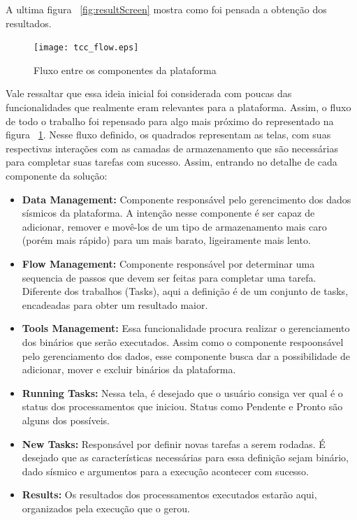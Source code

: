 \documentclass[11pt,twoside]{article}
\begin{document}
A ultima figura ~\ref{fig:resultScreen} mostra como foi pensada a obtenção dos resultados.

\begin{figure}[!h]
  \centering
  \texttt{[image: tcc\_flow.eps]}
  \caption{Fluxo entre os componentes da plataforma}
  \label{fig:flowScreen}
\end{figure}

Vale ressaltar que essa ideia inicial foi considerada com poucas das funcionalidades que realmente eram relevantes para a plataforma. Assim, o fluxo de todo o trabalho foi 
repensado para algo mais próximo do representado na figura ~\ref{fig:flowScreen}. Nesse fluxo definido, os quadrados representam as telas, com suas respectivas interações com 
as camadas de armazenamento que são necessárias para completar suas tarefas com sucesso. Assim, entrando no detalhe de cada componente da solução:

\begin{itemize}
  \item \textbf{Data Management:} Componente responsável pelo gerencimento dos dados sísmicos da plataforma. A intenção nesse componente é ser capaz de adicionar, remover e 
  movê-los de um tipo de armazenamento mais caro (porém mais rápido) para um mais barato, ligeiramente mais lento. 
  \item \textbf{Flow Management:} Componente responsável por determinar uma sequencia de passos que devem ser feitas para completar uma tarefa. Diferente dos trabalhos (Tasks),
  aqui a definição é de um conjunto de tasks, encadeadas para obter um resultado maior.
  \item \textbf{Tools Management:} Essa funcionalidade procura realizar o gerenciamento dos binários que serão executados. Assim como o componente respoonsável pelo gerenciamento
  dos dados, esse componente busca dar a possibilidade de adicionar, mover e excluir binários da plataforma.
  \item \textbf{Running Tasks:} Nessa tela, é desejado que o usuário consiga ver qual é o status dos processamentos que iniciou. Status como Pendente e Pronto são alguns dos 
  possíveis.
  \item \textbf{New Tasks:} Responsável por definir novas tarefas a serem rodadas. É desejado que as características necessárias para essa definição sejam binário, dado sísmico 
  e argumentos para a execução acontecer com sucesso. 
  \item \textbf{Results:} Os resultados dos processamentos executados estarão aqui, organizados pela execução que o gerou.
\end{itemize}
\end{document}
